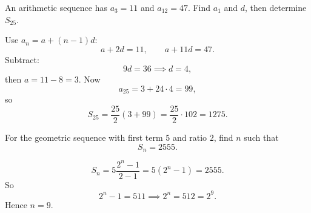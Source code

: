 \begin{problem}
An arithmetic sequence has $a_3=11$ and $a_{12}=47$. Find $a_1$ and $d$, then determine $S_{25}$.
\end{problem}
\begin{solution}
Use $a_n=a+(n-1)d$:
\[
a+2d=11,\qquad a+11d=47.
\]
Subtract:
\[
9d=36 \implies d=4,
\]
then $a=11-8=3$.
Now
\[
a_{25}=3+24\cdot 4=99,
\]
so
\[
S_{25}=\frac{25}{2}(3+99)=\frac{25}{2}\cdot 102=1275.
\]
\end{solution}

\begin{problem}
For the geometric sequence with first term $5$ and ratio $2$, find $n$ such that
\[
S_n=2555.
\]
\end{problem}
\begin{solution}
\[
S_n=5\frac{2^n-1}{2-1}=5(2^n-1)=2555.
\]
So
\[
2^n-1=511 \implies 2^n=512=2^9.
\]
Hence $n=9$.
\end{solution}



